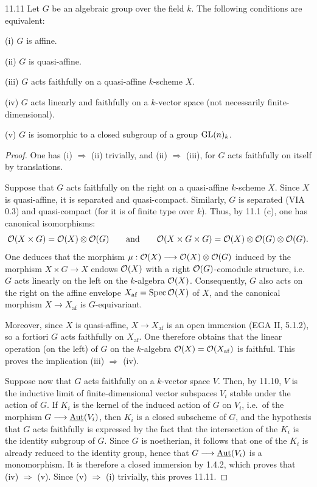 \begin{proposition}{11.11}\label{VIB.11.11}
Let $G$ be an algebraic group over the field $k$. The following conditions are equivalent:

(i) $G$ is affine.

(ii) $G$ is quasi-affine.

(iii) $G$ acts faithfully on a quasi-affine $k$-scheme $X$.

(iv) $G$ acts linearly and faithfully on a $k$-vector space (not necessarily finite-dimensional).

(v) $G$ is isomorphic to a closed subgroup of a group $\operatorname{GL}(n)_k$.
\end{proposition}
\begin{proof}
One has (i) $\Rightarrow$ (ii) trivially, and (ii) $\Rightarrow$ (iii), for $G$ acts faithfully on itself by translations.

Suppose that $G$ acts faithfully on the right on a quasi-affine $k$-scheme $X$. Since $X$ is quasi-affine, it is separated and quasi-compact. Similarly, $G$ is separated (VIA 0.3) and quasi-compact (for it is of finite type over $k$). Thus, by 11.1 (c), one has canonical isomorphisms:
\[
\mathcal{O}(X\times G)=\mathcal{O}(X)\otimes\mathcal{O}(G)\qquad\text{and}\qquad\mathcal{O}(X\times G\times G)=\mathcal{O}(X)\otimes\mathcal{O}(G)\otimes\mathcal{O}(G).
\]
One deduces that the morphism $\mu:\mathcal{O}(X)\longrightarrow\mathcal{O}(X)\otimes\mathcal{O}(G)$ induced by the morphism $X\times G\to X$ endows $\mathcal{O}(X)$ with a right $\mathcal{O}(G)$-comodule structure, i.e.\ $G$ acts linearly on the left on the $k$-algebra $\mathcal{O}(X)$. Consequently, $G$ also acts on the right on the affine envelope $X_{\mathrm{af}}=\operatorname{Spec}\mathcal{O}(X)$ of $X$, and the canonical morphism $X\to X_{\mathrm{af}}$ is $G$-equivariant.

Moreover, since $X$ is quasi-affine, $X\to X_{\mathrm{af}}$ is an open immersion (EGA II, 5.1.2), so a fortiori $G$ acts faithfully on $X_{\mathrm{af}}$. One therefore obtains that the linear operation (on the left) of $G$ on the $k$-algebra $\mathcal{O}(X)=\mathcal{O}(X_{\mathrm{af}})$ is faithful. This proves the implication (iii) $\Rightarrow$ (iv).

Suppose now that $G$ acts faithfully on a $k$-vector space $V$. Then, by 11.10, $V$ is the inductive limit of finite-dimensional vector subspaces $V_i$ stable under the action of $G$. If $K_i$ is the kernel of the induced action of $G$ on $V_i$, i.e.\ of the morphism $G\longrightarrow\underline{\operatorname{Aut}}(V_i)$, then $K_i$ is a closed subscheme of $G$, and the hypothesis that $G$ acts faithfully is expressed by the fact that the intersection of the $K_i$ is the identity subgroup of $G$. Since $G$ is noetherian, it follows that one of the $K_i$ is already reduced to the identity group, hence that $G\longrightarrow\underline{\operatorname{Aut}}(V_i)$ is a monomorphism. It is therefore a closed immersion by 1.4.2, which proves that (iv) $\Rightarrow$ (v). Since (v) $\Rightarrow$ (i) trivially, this proves 11.11.
\end{proof}

